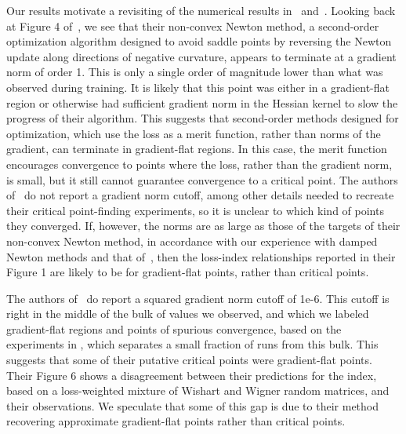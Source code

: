 \documentclass[../../thesis.tex]{subfiles}
\begin{document}
Our results motivate a revisiting of the numerical results
in~\cite{dauphin2014} and~\cite{pennington2017}.
Looking back at Figure 4 of~\cite{dauphin2014},
we see that their non-convex Newton method,
a second-order optimization algorithm designed to avoid saddle points
by reversing the Newton update along directions of negative curvature,
appears to terminate at a gradient norm of order 1.
This is only a single order of magnitude lower than what was observed during training.
It is likely that this point was either in a gradient-flat region
or otherwise had sufficient gradient norm in the Hessian kernel to
slow the progress of their algorithm.
This suggests that second-order methods
designed for optimization,
which use the loss as a merit function,
rather than norms of the gradient,
can terminate in gradient-flat regions.
In this case, the merit function encourages
convergence to points where the loss,
rather than the gradient norm, is small,
but it still cannot guarantee convergence to a critical point.
The authors of~\cite{dauphin2014} do not report a gradient norm cutoff,
among other details needed to recreate their critical point-finding experiments,
so it is unclear to which kind of points they converged.
If, however, the norms are as large as those of the targets of
their non-convex Newton method,
in accordance with our experience with damped Newton methods
and that of~\cite{coetzee1997},
then the loss-index relationships reported in their Figure 1
are likely to be for gradient-flat points,
rather than critical points.

The authors of~\cite{pennington2017}
do report a squared gradient norm cutoff of 1e-6.
This cutoff is right in the middle of the bulk of values
we observed,
and which we labeled gradient-flat regions and
points of spurious convergence,
based on the experiments in ,
which separates a small fraction of runs from this bulk.
This suggests that some of their putative critical points were gradient-flat points.
Their Figure 6 shows a disagreement between their predictions for the index,
based on a loss-weighted mixture of Wishart and Wigner random matrices,
and their observations.
We speculate that some of this gap is due to their method
recovering approximate gradient-flat points rather than critical points.
\end{document}
